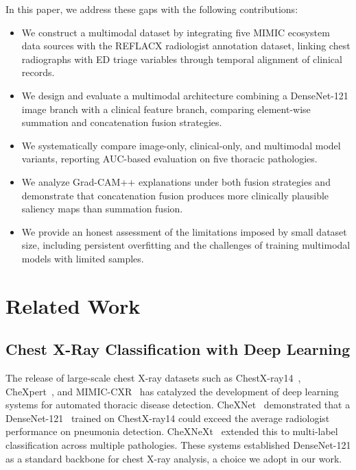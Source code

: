 \documentclass[conference]{IEEEtran}
\begin{document}
In this paper, we address these gaps with the following contributions:
\begin{itemize}
    \item We construct a multimodal dataset by integrating five MIMIC ecosystem data sources with the REFLACX radiologist annotation dataset, linking chest radiographs with ED triage variables through temporal alignment of clinical records.
    \item We design and evaluate a multimodal architecture combining a DenseNet-121 image branch with a clinical feature branch, comparing element-wise summation and concatenation fusion strategies.
    \item We systematically compare image-only, clinical-only, and multimodal model variants, reporting AUC-based evaluation on five thoracic pathologies.
    \item We analyze Grad-CAM++ explanations under both fusion strategies and demonstrate that concatenation fusion produces more clinically plausible saliency maps than summation fusion.
    \item We provide an honest assessment of the limitations imposed by small dataset size, including persistent overfitting and the challenges of training multimodal models with limited samples.
\end{itemize}

\section{Related Work}\label{sec:related}

\subsection{Chest X-Ray Classification with Deep Learning}

The release of large-scale chest X-ray datasets such as ChestX-ray14~\cite{wang2017chestxray14}, CheXpert~\cite{irvin2019chexpert}, and MIMIC-CXR~\cite{johnson2019mimiccxr} has catalyzed the development of deep learning systems for automated thoracic disease detection. CheXNet~\cite{rajpurkar2017chexnet} demonstrated that a DenseNet-121~\cite{huang2017densenet} trained on ChestX-ray14 could exceed the average radiologist performance on pneumonia detection. CheXNeXt~\cite{rajpurkar2018chexnext} extended this to multi-label classification across multiple pathologies. These systems established DenseNet-121 as a standard backbone for chest X-ray analysis, a choice we adopt in our work.
\end{document}
